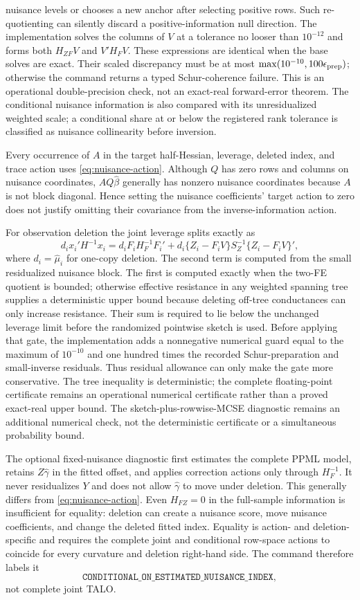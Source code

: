 \documentclass[11pt]{article}
\begin{document}
nuisance levels or chooses a new anchor after selecting positive rows. Such
re-quotienting can silently discard a positive-information null direction.
The implementation solves the columns of $V$ at a tolerance no looser than
$10^{-12}$ and forms both $H_{ZF}V$ and $V'H_FV$. These expressions are
identical when the base solves are exact. Their scaled discrepancy must be at
most $\max(10^{-10},100\epsilon_{\rm prep})$; otherwise the command returns a
typed Schur-coherence failure. This is an operational double-precision check,
not an exact-real forward-error theorem.
The conditional nuisance information is also compared with its unresidualized
weighted scale; a conditional share at or below the registered rank tolerance
is classified as nuisance collinearity before inversion.

Every occurrence of $A$ in the target half-Hessian, leverage, deleted index,
and trace action uses \eqref{eq:nuisance-action}. Although $Q$ has zero rows
and columns on nuisance coordinates, $AQ\widehat\beta$ generally has nonzero
nuisance coordinates because $A$ is not block diagonal. Hence setting the
nuisance coefficients' target action to zero does not justify omitting their
covariance from the inverse-information action.

For observation deletion the joint leverage splits exactly as
\[
 d_i x_i'H^{-1}x_i
 =d_i F_iH_F^{-1}F_i'
  +d_i\{Z_i-F_iV\}S_Z^{-1}\{Z_i-F_iV\}',
\]
where $d_i=\widehat\mu_i$ for one-copy deletion. The second term is computed
from the small residualized nuisance block. The first is computed exactly when
the two-FE quotient is bounded; otherwise effective resistance in any weighted
spanning tree supplies a deterministic upper bound because deleting off-tree
conductances can only increase resistance. Their sum is required to lie below
the unchanged leverage limit before the randomized pointwise sketch is used.
Before applying that gate, the implementation adds a nonnegative numerical
guard equal to the maximum of $10^{-10}$ and one hundred times the recorded
Schur-preparation and small-inverse residuals. Thus residual allowance can
only make the gate more conservative. The tree inequality is deterministic;
the complete floating-point certificate remains an operational numerical
certificate rather than a proved exact-real upper bound.
The sketch-plus-rowwise-MCSE diagnostic remains an additional numerical check,
not the deterministic certificate or a simultaneous probability bound.

The optional fixed-nuisance diagnostic first estimates the complete PPML
model, retains $Z\widehat\gamma$ in the fitted offset, and applies correction
actions only through $H_F^{-1}$. It never residualizes $Y$ and does not allow
$\widehat\gamma$ to move under deletion. This generally differs from
\eqref{eq:nuisance-action}. Even $H_{FZ}=0$ in the full-sample information is
insufficient for equality: deletion can create a nuisance score, move nuisance
coefficients, and change the deleted fitted index. Equality is action- and
deletion-specific and requires the complete joint and conditional row-space
actions to coincide for every curvature and deletion right-hand side. The
command therefore labels it
\[
 \texttt{CONDITIONAL\_ON\_ESTIMATED\_NUISANCE\_INDEX},
\]
not complete joint TALO.
\end{document}
